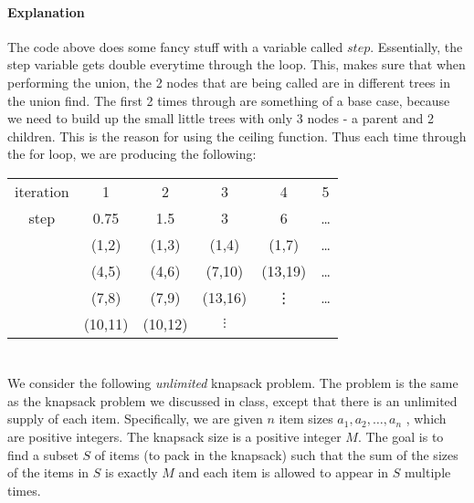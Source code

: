 \documentclass{article}
\begin{document}
\paragraph{Explanation}
The code above does some fancy stuff with a variable called $step$.
Essentially, the step variable gets double everytime through the 
loop. This, makes sure that when performing the union, the 2 nodes
that are being called are in different trees in the union find.
The first 2 times through are something of a base case, because we
need to build up the small little trees with only 3 nodes - a parent
and 2 children. This is the reason for using the ceiling function.
Thus each time through the for loop, we are producing the following:
\begin{center}
\begin{tabular}{cccccc}
  \toprule
  iteration &1 & 2 &3 & 4 &5 \\
  step & 0.75 & 1.5 & 3 & 6 &\dots\\
  \midrule
  & (1,2)  & (1,3)  & (1,4)    & (1,7)  & \dots \\
  & (4,5)  & (4,6)  & (7,10)   & (13,19)& \dots \\
  & (7,8)  & (7,9)  & (13,16)  & \vdots & \dots \\
  & (10,11)& (10,12)& $\vdots$ & & \\
  \bottomrule
\end{tabular}
\end{center}
  




\section{}
We consider the following \emph{unlimited} knapsack problem. The
problem is the same as the knapsack problem we discussed in class,
except that there is an unlimited supply of each item. Specifically,
we are given $n$ item sizes $a_1 ,a_2 ,\dots,a_n$ , which are positive
integers. The knapsack size is a positive integer $M$. The goal is to
find a subset $S$ of items (to pack in the knapsack) such that the sum
of the sizes of the items in $S$ is exactly $M$ and each item is
allowed to appear in $S$ multiple times. 
\end{document}
